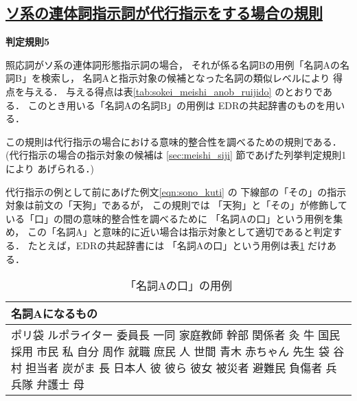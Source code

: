 \subsection*{\underline{ソ系の連体詞指示詞が代行指示をする場合の規則}}


\noindent
{\bf 判定規則5}
\begin{indention}{0.8cm}\noindent
  照応詞がソ系の連体詞形態指示詞の場合，
  それが係る名詞Bの用例「名詞Aの名詞B」を検索し，
  名詞Aと指示対象の候補となった名詞の類似レベルにより
  得点を与える．
  与える得点は{表\ref{tab:sokei_meishi_anob_ruijido}} のとおりである．
  このとき用いる「名詞Aの名詞B」の用例は
  EDRの共起辞書\cite{edr_kyouki_2.1}のものを用いる．
\end{indention}
\vspace{0.5cm}

この規則は代行指示の場合における意味的整合性を調べるための規則である．
  (代行指示の場合の指示対象の候補は
  \ref{sec:meishi_siji} 節であげた列挙判定規則1により
  あげられる．)

代行指示の例として前にあげた例文\ref{eqn:sono_kuti} の
下線部の「その」の指示対象は前文の「天狗」であるが，
この規則では
「天狗」と「その」が修飾している「口」の間の意味的整合性を調べるために
「名詞Aの口」という用例を集め，
この「名詞A」と意味的に近い場合は指示対象として適切であると判定する．
たとえば，EDRの共起辞書\cite{edr_kyouki_2.1}には
「名詞Aの口」という用例は表\ref{fig:meishi_A_kuti} だけある．

\begin{table}[t]
  \caption{「名詞Aの口」の用例}
  \label{fig:meishi_A_kuti}

\begin{center}
\begin{tabular}[c]{|p{11.5cm}|}\hline
名詞Aになるもの \\\hline
ポリ袋 ルポライター 委員長 一同 家庭教師 幹部 関係者 灸 牛 国民 採用 市民 私 自分 周作 就職 庶民 人 世間 青木 赤ちゃん 先生 袋 谷村 担当者 炭がま 長 日本人 彼 彼ら 彼女 被災者 避難民 負傷者 兵 兵隊 弁護士 母 \\\hline
\end{tabular}
\end{center}
\end{table}

